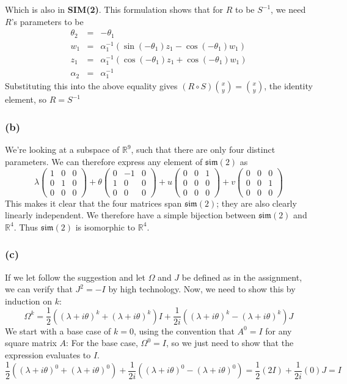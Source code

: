 \documentclass{article}
\newcommand{\reals}{\mathbb{R}}
\newcommand{\simtwo}{\textbf{SIM(2)}}
\begin{document}
Which is also in \simtwo.
This formulation shows that for $R$ to be $S^{-1}$, we need $R$'s parameters to be
\begin{eqnarray*}
  \theta_2 &=&  -\theta_1\\
  w_1 &=& \alpha_1^{-1}(\sin(-\theta_1)z_1 - \cos(-\theta_1)w_1)\\
  z_1 &=& \alpha_1^{-1}(\cos(-\theta_1)z_1 + \cos(-\theta_1)w_1)\\
  \alpha_2 &=&  \alpha_1^{-1}
\end{eqnarray*}
Substituting this into the above equality gives $(R \circ S) \binom{x}{y} = \binom{x}{y}$, the identity element, so $R = S^{-1}$
\subsubsection{(b)}
We're looking at a subspace of $\reals^9$, such that there are only four distinct parameters.
We can therefore express any element of $\mathfrak{sim}(2)$ as
\[
\lambda \left(\begin{array}{ccc}
      1 & 0 & 0\\
      0 & 1 & 0\\
      0 & 0 & 0
    \end{array}\right) 
 + \theta \left(\begin{array}{ccc}
      0 & -1 & 0\\
      1 & 0 & 0\\
      0 & 0 & 0
    \end{array}\right) 
 + u\left(\begin{array}{ccc}
      0 & 0 & 1\\
      0 & 0 & 0\\
      0 & 0 & 0
    \end{array}\right) 
 + v\left(\begin{array}{ccc}
      0 & 0 & 0\\
      0 & 0 & 1\\
      0 & 0 & 0
    \end{array}\right) 
\]
This makes it clear that the four matrices span $\mathfrak{sim}(2)$; they are also clearly linearly independent.
We therefore have a simple bijection between $\mathfrak{sim}(2)$ and $\reals^4$.
Thus $\mathfrak{sim}(2)$ is isomorphic to $\reals^4$.
\subsubsection{(c)}
If we let follow the suggestion and let $\Omega$ and $J$ be defined as in the assignment,
we can verify that $J^2 = -I$ by high technology.
Now, we need to show this by induction on $k$:
\[ \Omega^k = \frac{1}{2}\left((\lambda + i\theta)^k + (\lambda + i\theta)^k \right)I
  + \frac{1}{2i}\left((\lambda + i\theta)^k - (\lambda + i\theta)^k \right) J\]
We start with a base case of $k=0$, using the convention that $A^0 = I$ for any square matrix $A$:
For the base case, $\Omega^0 = I$, so we just need to show that the expression evaluates to $I$.
\[
  \frac{1}{2}\left((\lambda + i\theta)^0 + (\lambda + i\theta)^0 \right)
  + \frac{1}{2i}\left((\lambda + i\theta)^0 - (\lambda + i\theta)^0 \right) = \frac{1}{2} (2I) + \frac{1}{2i}(0)J = I
\]
\end{document}
